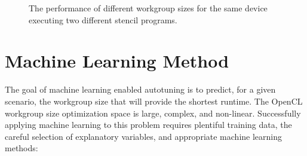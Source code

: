 \documentclass[hidelinks]{acaces}
\DeclareMathOperator*{\argmin}{arg\,min}
\begin{document}
\begin{figure}
{\begin{minipage}{.48\textwidth}
\begin{subfigure}[h]{.48\columnwidth}
      \vspace{-1.5em} %
      \caption{}
      \label{fig:motivation-4}
    \end{subfigure}
    \caption{%
      The performance of different workgroup sizes for the same device
      executing two different stencil programs.%
    }
    \label{fig:motivation-prog}
  \end{minipage}%
}
\end{figure}


\section{Machine Learning Method}

The goal of machine learning enabled autotuning is to predict, for a
given scenario, the workgroup size that will provide the shortest
runtime.
%
The OpenCL workgroup size optimization space is large, complex, and
non-linear. Successfully applying machine learning to this problem
requires plentiful training data, the careful selection of explanatory
variables, and appropriate machine learning methods:
\end{document}

